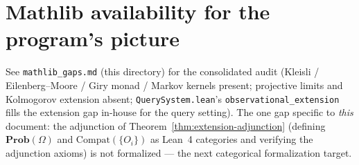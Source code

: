 \documentclass[11pt]{article}
\newcommand{\Prob}{\mathbf{Prob}}
\begin{document}
\section{Mathlib availability for the program's picture}
\label{sec:mathlib}

See \texttt{mathlib\_gaps.md} (this directory) for the consolidated audit
(Kleisli / Eilenberg--Moore / Giry monad / Markov kernels present; projective
limits and Kolmogorov extension absent; \texttt{QuerySystem.lean}'s
\texttt{observational\_extension} fills the extension gap in-house for the query
setting). The one gap specific to \emph{this} document: the adjunction of
Theorem~\ref{thm:extension-adjunction} (defining $\Prob(\Omega)$ and
$\mathrm{Compat}(\{O_i\})$ as Lean~4 categories and verifying the adjunction
axioms) is not formalized --- the next categorical formalization target.
\end{document}
